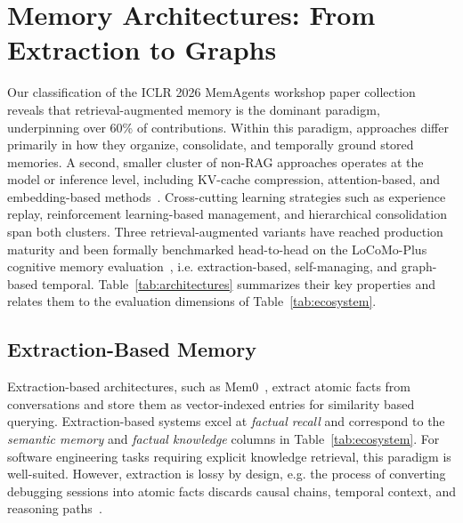\documentclass[runningheads]{llncs}
\begin{document}
\section{Memory Architectures: From Extraction to Graphs}\label{sec:architectures}

Our classification of the ICLR 2026 MemAgents workshop paper
collection~\cite{memagents2026} reveals that retrieval-augmented
memory is the dominant paradigm, underpinning over 60\% of
contributions. Within this paradigm, approaches differ primarily in
how they organize, consolidate, and temporally ground stored
memories. A second, smaller cluster of non-RAG approaches operates
at the model or inference level, including KV-cache compression,
attention-based, and embedding-based methods~\cite{hu2025survey}. Cross-cutting learning
strategies such as experience replay, reinforcement learning-based
management, and hierarchical consolidation span both clusters.
Three retrieval-augmented variants have reached production maturity
and been formally benchmarked head-to-head on the LoCoMo-Plus
cognitive memory evaluation~\cite{gurawaliya2026}, i.e. extraction-based, self-managing, and graph-based temporal. Table~\ref{tab:architectures} summarizes their key properties and relates them to the evaluation dimensions of Table~\ref{tab:ecosystem}.

\subsection{Extraction-Based Memory}

Extraction-based architectures, such as Mem0~\cite{mem0_2025}, extract atomic facts from conversations and store
them as vector-indexed entries for similarity based querying. Extraction-based systems excel at
\emph{factual recall} and correspond to the \emph{semantic memory} and \emph{factual knowledge} columns in Table~\ref{tab:ecosystem}. For software engineering tasks requiring explicit knowledge retrieval, this paradigm
is well-suited. However, extraction is lossy by design, e.g. the
process of converting debugging sessions into atomic facts discards
causal chains, temporal context, and reasoning paths~\cite{diagnosing2026}.

\end{document}

